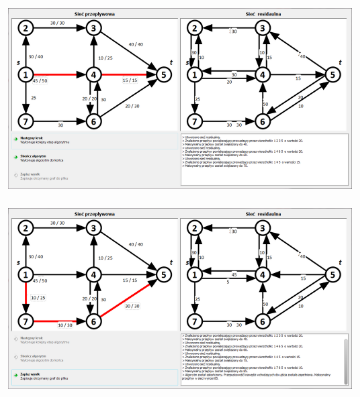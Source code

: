 \begin{appendices}
\begin{figure}[H]
\begin{subfigure}{\textwidth}
 		\end{subfigure}\par\bigskip
 		\begin{subfigure}{\textwidth}
 			\includegraphics[width=0.9\linewidth]{./img/spec_zew06_4.png}
 		\end{subfigure}\par\bigskip
 		\begin{subfigure}{\textwidth}
 			\includegraphics[width=0.9\linewidth]{./img/spec_zew06_5.png}
 		\end{subfigure}
 	\end{figure}

\end{appendices}
